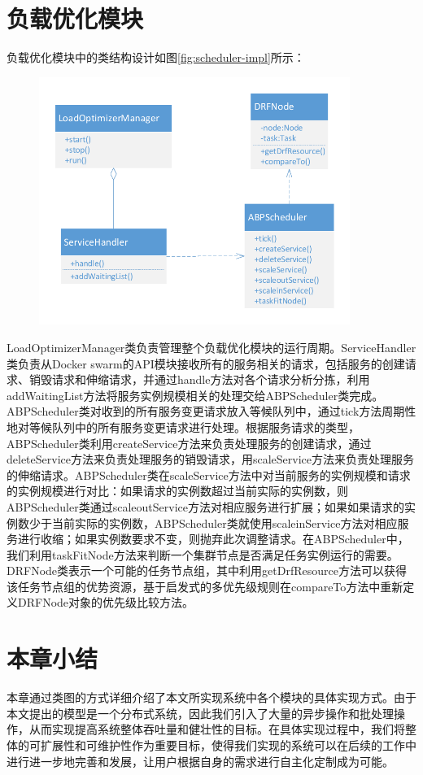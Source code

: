 \section{负载优化模块}
负载优化模块中的类结构设计如图\ref{fig:scheduler-impl}所示：
\begin{figure}[H]
\centering
\includegraphics[width=0.9\textwidth]{./figure/scheduler_impl}
\end{figure}
LoadOptimizerManager类负责管理整个负载优化模块的运行周期。ServiceHandler类负责从Docker swarm的API模块接收所有的服务相关的请求，包括服务的创建请求、销毁请求和伸缩请求，并通过handle方法对各个请求分析分拣，利用addWaitingList方法将服务实例规模相关的处理交给ABPScheduler类完成。ABPScheduler类对收到的所有服务变更请求放入等候队列中，通过tick方法周期性地对等候队列中的所有服务变更请求进行处理。根据服务请求的类型，ABPScheduler类利用createService方法来负责处理服务的创建请求，通过deleteService方法来负责处理服务的销毁请求，用scaleService方法来负责处理服务的伸缩请求。ABPScheduler类在scaleService方法中对当前服务的实例规模和请求的实例规模进行对比：如果请求的实例数超过当前实际的实例数，则ABPScheduler类通过scaleoutService方法对相应服务进行扩展；如果如果请求的实例数少于当前实际的实例数，ABPScheduler类就使用scaleinService方法对相应服务进行收缩；如果实例数要求不变，则抛弃此次调整请求。在ABPScheduler中，我们利用taskFitNode方法来判断一个集群节点是否满足任务实例运行的需要。DRFNode类表示一个可能的任务节点组，其中利用getDrfResource方法可以获得该任务节点组的优势资源，基于启发式的多优先级规则在compareTo方法中重新定义DRFNode对象的优先级比较方法。

\section{本章小结}
本章通过类图的方式详细介绍了本文所实现系统中各个模块的具体实现方式。由于本文提出的模型是一个分布式系统，因此我们引入了大量的异步操作和批处理操作，从而实现提高系统整体吞吐量和健壮性的目标。在具体实现过程中，我们将整体的可扩展性和可维护性作为重要目标，使得我们实现的系统可以在后续的工作中进行进一步地完善和发展，让用户根据自身的需求进行自主化定制成为可能。